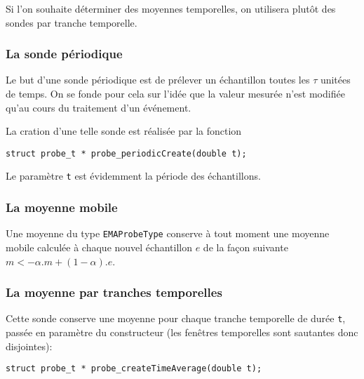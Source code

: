    Si l'on souhaite déterminer des moyennes temporelles, on utilisera
plutôt des sondes par tranche temporelle.

%
\subsubsection{La sonde périodique}

   Le but d'une sonde périodique est de prélever un échantillon toutes
les $\tau$ unitées de temps. On se fonde pour cela sur l'idée que la
valeur mesurée n'est modifiée qu'au cours du traitement d'un
événement.

   La cration d'une telle sonde est réalisée par la fonction 

\begin{verbatim}
struct probe_t * probe_periodicCreate(double t);
\end{verbatim}

   Le paramètre {\tt t} est évidemment la période des échantillons.

%
\subsubsection{La moyenne mobile}

   Une moyenne du type \lstinline!EMAProbeType! conserve à tout moment
une moyenne mobile calculée à chaque nouvel échantillon $e$ de la façon
suivante $m <- \alpha . m + (1 - \alpha).e$.

%
\subsubsection{La moyenne par tranches temporelles}

   Cette sonde conserve une moyenne pour chaque tranche temporelle de
durée {\tt t}, passée en paramètre du constructeur (les fenêtres
temporelles sont sautantes donc disjointes):

\begin{verbatim}
struct probe_t * probe_createTimeAverage(double t);
\end{verbatim}


